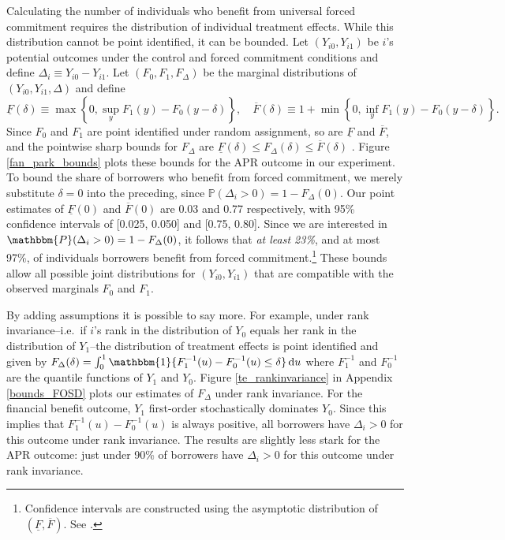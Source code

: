 \documentclass[12pt, a4paper]{article}
\begin{document}
Calculating the number of individuals who benefit from universal forced commitment requires the distribution of individual treatment effects.
While this distribution cannot be point identified, it can be bounded.
Let $(Y_{i0}, Y_{i1})$ be $i$'s potential outcomes under the control and forced commitment conditions and define $\Delta_i \equiv Y_{i0} - Y_{i1}$.
Let $(F_0, F_1, F_\Delta)$ be the marginal distributions of $(Y_{i0}, Y_{i1}, \Delta)$ and define 
\[
\underline{F}(\delta) \equiv \max \left\{0, \sup_y F_1(y) - F_0(y - \delta)  \right\}, \quad
\overline{F}(\delta) \equiv 1 + \min \left\{0, \inf_y F_1(y) - F_0(y-\delta) \right\}.
\]
Since $F_0$ and $F_1$ are point identified under random assignment, so are $\underline{F}$ and $\overline{F}$, and the pointwise sharp bounds for $F_\Delta$ are $\underline{F}(\delta) \leq F_\Delta(\delta) \leq \overline{F}(\delta)$ \citep{fan2010sharp}.
Figure \ref{fan_park_bounds} plots these bounds for the APR outcome in our experiment.  
To bound the share of borrowers who benefit from forced commitment, we merely substitute $\delta=0$ into the preceding, since $\mathbb{P}(\Delta_i > 0) = 1 - F_\Delta(0)$.
Our point estimates of $\underline{F}(0)$ and $\overline{F}(0)$ are 0.03 and 0.77 respectively, with 95\% confidence intervals of [0.025, 0.050] and [0.75, 0.80]. Since we are interested in $\mathbbm{P}(\Delta_i >0) = 1 - F_\Delta(0)$, it follows that \textit{at least 23\%}, and at most 97\%, of individuals borrowers benefit from forced commitment.\footnote{Confidence intervals are constructed using the asymptotic distribution of $(\underline{F}, \overline{F})$. See \cite{fan2010sharp}.} 
These bounds allow all possible joint distributions for $(Y_{i0}, Y_{i1})$ that are compatible with the observed marginals $F_0$ and $F_1$.

By adding assumptions it is possible to say more.
For example, under rank invariance--i.e.\ if $i$'s rank in the distribution of $Y_0$ equals her rank in the distribution of $Y_1$--the distribution of treatment effects is point identified and given by $F_\Delta(\delta) = \int_0^1 \mathbbm{1}\{ F_1^{-1}(u) - F_0^{-1}(u)\leq \delta\}\,\mathrm{d}u$ where $F_1^{-1}$ and $F_0^{-1}$ are the quantile functions of $Y_1$ and $Y_0$. Figure \ref{te_rankinvariance} in Appendix \ref{bounds_FOSD} plots our estimates of $F_\Delta$ under rank invariance.
For the financial benefit outcome, $Y_1$ first-order stochastically dominates $Y_0$. Since this implies that $F^{-1}_1(u) - F^{-1}_0(u)$ is always positive, all borrowers have $\Delta_i > 0$ for this outcome under rank invariance.
The results are slightly less stark for the APR outcome: just under 90\% of borrowers have $\Delta_i > 0$ for this outcome under rank invariance.
\end{document}
